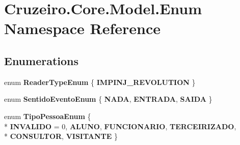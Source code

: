 \hypertarget{namespace_cruzeiro_1_1_core_1_1_model_1_1_enum}{}\section{Cruzeiro.\+Core.\+Model.\+Enum Namespace Reference}
\label{namespace_cruzeiro_1_1_core_1_1_model_1_1_enum}
\subsection*{Enumerations}
\begin{DoxyCompactItemize}
\item 
enum {\bfseries Reader\+Type\+Enum} \{ {\bfseries I\+M\+P\+I\+N\+J\+\_\+\+R\+E\+V\+O\+L\+U\+T\+I\+ON}
 \}\hypertarget{namespace_cruzeiro_1_1_core_1_1_model_1_1_enum_a8e0dc749ded3cdc98d1820f4520336b4}{}\label{namespace_cruzeiro_1_1_core_1_1_model_1_1_enum_a8e0dc749ded3cdc98d1820f4520336b4}

\item 
enum {\bfseries Sentido\+Evento\+Enum} \{ {\bfseries N\+A\+DA}, 
{\bfseries E\+N\+T\+R\+A\+DA}, 
{\bfseries S\+A\+I\+DA}
 \}\hypertarget{namespace_cruzeiro_1_1_core_1_1_model_1_1_enum_a5c8dad655a985948c036d4c3c11fae7f}{}\label{namespace_cruzeiro_1_1_core_1_1_model_1_1_enum_a5c8dad655a985948c036d4c3c11fae7f}

\item 
enum {\bfseries Tipo\+Pessoa\+Enum} \{ \\*
{\bfseries I\+N\+V\+A\+L\+I\+DO} = 0, 
{\bfseries A\+L\+U\+NO}, 
{\bfseries F\+U\+N\+C\+I\+O\+N\+A\+R\+IO}, 
{\bfseries T\+E\+R\+C\+E\+I\+R\+I\+Z\+A\+DO}, 
\\*
{\bfseries C\+O\+N\+S\+U\+L\+T\+OR}, 
{\bfseries V\+I\+S\+I\+T\+A\+N\+TE}
 \}\hypertarget{namespace_cruzeiro_1_1_core_1_1_model_1_1_enum_a71ec6f245b8bf7b130215a879d95e7f8}{}\label{namespace_cruzeiro_1_1_core_1_1_model_1_1_enum_a71ec6f245b8bf7b130215a879d95e7f8}

\end{DoxyCompactItemize}
